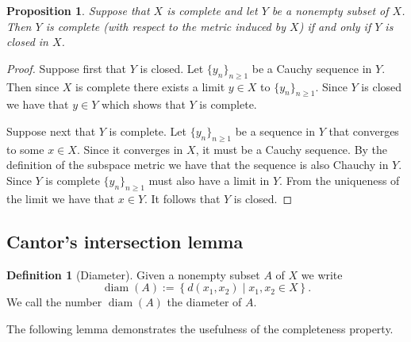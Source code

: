 \documentclass[11pt,a4paper]{article}
\theoremstyle{definition}
\newtheorem{definition}{Definition}[section]
\theoremstyle{plain}
\newtheorem{proposition}[theorem]{Proposition}
\DeclareMathOperator{\diam}{diam}
\newcommand{\set}[2]{ \left\{ #1 \mid #2 \right\} }
\begin{document}
  \begin{proposition}
    Suppose that $X$ is complete and let $Y$ be a nonempty subset of $X$. 
    Then $Y$ is complete (with respect to the metric induced by $X$) if and 
    only if $Y$ is closed in $X$.
  \end{proposition}
  \begin{proof}
    Suppose first that $Y$ is closed. Let $\{y_n\}_{n \geq 1}$ be a Cauchy
    sequence in $Y$. Then since $X$ is complete there exists a limit $y \in X$
    to $\{y_n\}_{n \geq 1}$. Since $Y$ is closed we have that $y \in Y$
    which shows that $Y$ is complete.

    Suppose next that $Y$ is complete. Let $\{y_n\}_{n \geq 1}$ be a sequence
    in $Y$ that converges to some $x \in X$. Since it converges in $X$,
    it must be a Cauchy sequence. By the definition of the subspace metric
    we have that the sequence is also Chauchy in $Y$. Since $Y$ is complete
    $\{y_n\}_{n \geq 1}$ must also have a limit in $Y$. From the uniqueness
    of the limit we have that $x \in Y$. It follows that $Y$ is closed.
  \end{proof}

  \subsection{Cantor’s intersection lemma}
  
  \begin{definition}[Diameter]
    Given a nonempty subset $A$ of $X$ we write
    \[
      \diam(A) := \set{d(x_1,x_2)}{x_1,x_2 \in X}.
    \]
    We call the number $\diam(A)$ the diameter of $A$.
  \end{definition}
  
  The following lemma demonstrates the usefulness of the completeness property.
  
\end{document}
